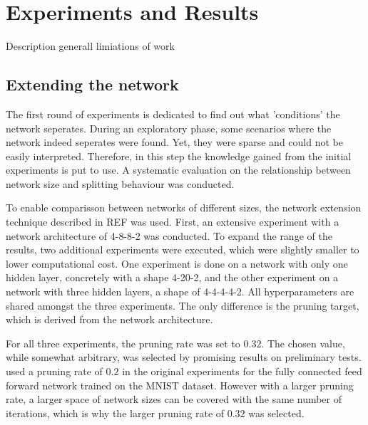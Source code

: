 \section{Experiments and Results}
Description generall
limiations of work

\subsection{Extending the network}
The first round of experiments is dedicated to find out what 'conditions' the network seperates.
During an exploratory phase, some scenarios where the network indeed seperates were found.
Yet, they were sparse and could not be easily interpreted.
Therefore, in this step the knowledge gained from the initial experiments is put to use.
A systematic evaluation on the relationship between network size and splitting behaviour was conducted.

To enable comparisson between networks of different sizes, the network extension technique described in REF was used.
First, an extensive experiment with a network architecture of 4-8-8-2 was conducted.
To expand the range of the results, two additional experiments were executed, which were slightly smaller to lower computational cost.
One experiment is done on a network with only one hidden layer, concretely with a shape 4-20-2, and the other experiment on a network with three hidden layers, a shape of 4-4-4-4-2.
All hyperparameters are shared amongst the three experiments.
The only difference is the pruning target, which is derived from the network architecture.

For all three experiments, the pruning rate was set to $0.32$.
The chosen value, while somewhat arbitrary, was selected by promising results on preliminary tests.
\textcite{DBLP:conf/iclr/FrankleC19} used a pruning rate of $0.2$ in the original experiments for the fully connected feed forward network trained on the MNIST dataset.
However with a larger pruning rate, a larger space of network sizes can be covered with the same number of iterations, which is why the larger pruning rate of $0.32$ was selected.

